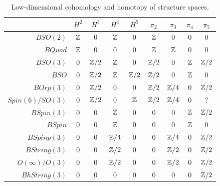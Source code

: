 \documentclass{amsart}
\begin{document}
\begin{table}[!ht]
\begin{tabular}{|r||c|c|c|c||c|c|c|c|}
\hline
& $H^2$ & $H^3$ & $H^4$ & $H^5$ & $\pi_2$ & $\pi_3$ & $\pi_4$ & $\pi_5$ \\
\hline
$BSO(2)$ %
& $\mathbb Z$ & $0$ & $\mathbb Z$ & $0$ 
& $\mathbb Z$ & $0$ & $0$ & $0$ \\
$BQuad$ %
& $\mathbb Z$ & $0$ & $0$ & $0$
& $\mathbb Z$ & $\mathbb Z$ & $0$ & $0$ \\
$BSO(3)$ %
& $0$ & $\mathbb Z/2$ & $\mathbb Z$ & $0$
& $\mathbb Z/2$ & $0$ & $\mathbb Z$ & $\mathbb Z/2$ \\ %
$BSO$
& $0$ & $\mathbb Z/2$ & $\mathbb Z$ & $\mathbb Z/2$ %
& $\mathbb Z/2$ & $0$ & $\mathbb Z$ & $0$ \\ %
$BOrp(3)$ %
& $0$ & $\mathbb Z/2$ & $0$ & $0$ 
& $\mathbb Z/2$ & $\mathbb Z/4$ & $0$ & $\mathbb Z/2$  \\
$Spin(6)/SO(3)$ %
& $0$ & $\mathbb Z/2$ & $0$ & $\mathbb Z$ %
& $\mathbb Z/2$ & $\mathbb Z/4$ & $0$ & $?$ \\
$BSpin(3)$ %
& $0$ & $0$ & $\mathbb Z$ & $0$
& $0$ & $0$ & $\mathbb Z$ & $\mathbb Z/2$ \\
$BSpin$
& $0$ & $0$ & $\mathbb Z$ & $0$ %
& $0$ & $0$ & $\mathbb Z$ & $0$ \\ %
$BSpinp(3)$
& $0$ & $0$ & $\mathbb Z/4$ & $0$
& $0$ & $\mathbb Z/4$ & $0$ & $\mathbb Z/2$ \\
$BString(3)$ %
& $0$ & $0$ & $\mathbb Z/2$ & $0$
& $0$ & $\mathbb Z/2$ & $0$ & $\mathbb Z/2$ \\
$O(\infty)/O(3)$ %
& $0$ & $0$ & $\mathbb Z/2$ & $0$
& $0$ & $\mathbb Z/2$ & $0$ & $\mathbb Z/2$ \\
$BhString(3)$ %
& $0$ & $0$ & $0$ & $0$
& $0$ & $0$ & $0$ & $\mathbb Z/2$ \\
\hline 
\end{tabular} \vspace*{8pt}
\caption{Low-dimensional cohomology and homotopy of structure spaces.} \label{table-structurecalc}
\end{table} 
\end{document}

